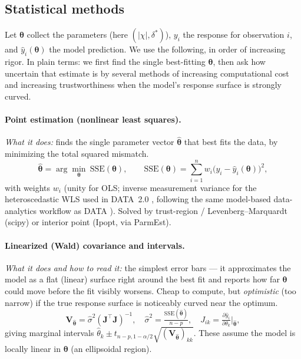 \documentclass[11pt]{article}
\newcommand{\dstar}{\delta^{*}}
\newcommand{\thetahat}{\hat{\boldsymbol\theta}}
\newcommand{\SSE}{\mathrm{SSE}}
\begin{document}
\subsection{Statistical methods}\label{sec:stats}
Let $\boldsymbol\theta$ collect the parameters (here $(|\chi|,\dstar)$),
$y_i$ the response for observation $i$, and $\hat y_i(\boldsymbol\theta)$ the
model prediction. We use the following, in order of increasing rigor. In
plain terms: we first find the single best-fitting $\boldsymbol\theta$, then
ask how uncertain that estimate is by several methods of increasing
computational cost and increasing trustworthiness when the model's response
surface is strongly curved.

\paragraph{Point estimation (nonlinear least squares).} \emph{What it does:}
finds the single parameter vector $\thetahat$ that best fits the data, by
minimizing the total squared mismatch.
\begin{equation}
  \thetahat = \arg\min_{\boldsymbol\theta}\ \SSE(\boldsymbol\theta),
  \qquad
  \SSE(\boldsymbol\theta)=\sum_{i=1}^{n} w_i\big(y_i-\hat y_i(\boldsymbol\theta)\big)^2,
  \label{eq:nls}
\end{equation}
with weights $w_i$ (unity for OLS; inverse measurement variance for the
heteroscedastic WLS used in DATA~2.0 \cite{liu2025data2}, following the same
model-based data-analytics workflow as DATA \cite{ouimet2022data1}). Solved by
trust-region / Levenberg--Marquardt (scipy) or interior point (Ipopt, via
ParmEst).

\paragraph{Linearized (Wald) covariance and intervals.} \emph{What it does
and how to read it:} the simplest error bars --- it approximates the model as
a flat (linear) surface right around the best fit and reports how far
$\boldsymbol\theta$ could move before the fit visibly worsens. Cheap to
compute, but \emph{optimistic} (too narrow) if the true response surface is
noticeably curved near the optimum.
\begin{equation}
  \mathbf V_{\thetahat} = \hat\sigma^2 (\mathbf J^\top\mathbf J)^{-1},
  \quad \hat\sigma^2=\tfrac{\SSE(\thetahat)}{n-p},
  \quad J_{ik}=\tfrac{\partial \hat y_i}{\partial\theta_k}\Big|_{\thetahat},
  \label{eq:cov}
\end{equation}
giving marginal intervals $\hat\theta_k\pm t_{n-p,1-\alpha/2}\sqrt{(\mathbf
V_{\thetahat})_{kk}}$. These assume the model is locally linear in
$\boldsymbol\theta$ (an ellipsoidal region).
\end{document}
